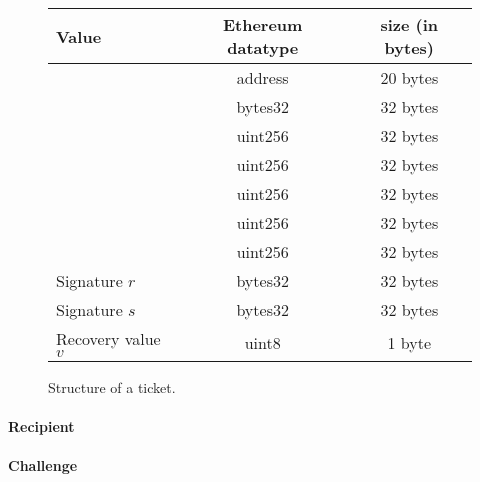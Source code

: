 \begin{figure}[H]
      \centering
      \begin{tabular}{|l|c|c|}
            \hline
            \textbf{Value}                                    & \textbf{Ethereum datatype} & \textbf{size (in bytes)} \\
            \hline
            \hline
            \nameref{sec:tickets:issuance:recipient}          & address                    & 20 bytes                 \\
            \nameref{sec:tickets:issuance:challenge}          & bytes32                    & 32 bytes                 \\
            \nameref{sec:tickets:issuance:ticketepoch}        & uint256                    & 32 bytes                 \\
            \nameref{sec:tickets:issuance:ticketvalue}        & uint256                    & 32 bytes                 \\
            \nameref{sec:tickets:issuance:winningprobability} & uint256                    & 32 bytes                 \\
            \nameref{sec:tickets:issuance:ticketindex}        & uint256                    & 32 bytes                 \\
            \nameref{sec:tickets:issuance:channelepoch}       & uint256                    & 32 bytes                 \\
            \hline
            \hline
            Signature $r$                                     & bytes32                    & 32 bytes                 \\
            Signature $s$                                     & bytes32                    & 32 bytes                 \\
            Recovery value $v$                                & uint8                      & 1 byte                   \\
            \hline
      \end{tabular}
      \caption{Structure of a ticket.}
\end{figure}

\paragraph{Recipient}
\label{sec:tickets:issuance:recipient}

\paragraph{Challenge}
\label{sec:tickets:issuance:challenge}

